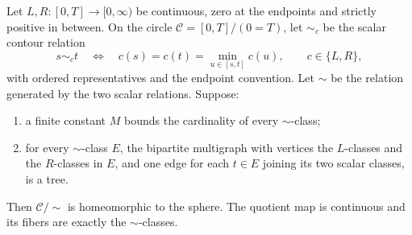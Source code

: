 \begin{theorem}\label{view:moore}
Let $L,R:[0,T]\to[0,\infty)$ be continuous, zero at the endpoints and
strictly positive in between.  On the circle $\mathcal C=[0,T]/(0=T)$,
let $\sim_c$ be the scalar contour relation
\[
 s\sim_c t\quad\Longleftrightarrow\quad
 c(s)=c(t)=\min_{u\in[s,t]}c(u),\qquad c\in\{L,R\},
\]
with ordered representatives and the endpoint convention.  Let $\sim$ be
the relation generated by the two scalar relations.  Suppose:
\begin{enumerate}[label=(\roman*)]
\item a finite constant $M$ bounds the cardinality of every $\sim$-class;
\item for every $\sim$-class $E$, the bipartite multigraph with vertices the
$L$-classes and the $R$-classes in $E$, and one edge for each $t\in E$
joining its two scalar classes, is a tree.
\end{enumerate}
Then $\mathcal C/\sim$ is homeomorphic to the sphere.  The quotient map is
continuous and its fibers are exactly the $\sim$-classes.
\end{theorem}

